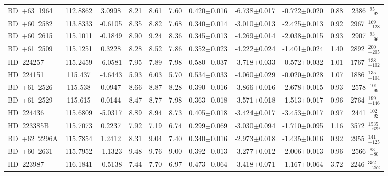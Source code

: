 {\begin{longtable}{lcccccccccc}
\noalign{\smallskip}
BD~+63~1964 & 112.8862 & 3.0998 & 8.21 & 8.61 & 7.60 & 0.420$\pm$0.016 & -6.738$\pm$0.017 & -0.722$\pm$0.020 & 0.88 & 2386~$_{-92}^{95}$ \\
\noalign{\smallskip}
BD~+60~2582 & 113.8333 & -0.6105 & 8.35 & 8.82 & 7.68 & 0.340$\pm$0.014 & -3.010$\pm$0.013 & -2.425$\pm$0.013 & 0.92 & 2967~$_{-128}^{169}$ \\
\noalign{\smallskip}
BD~+60~2615 & 115.1011 & -0.1849 & 8.90 & 9.24 & 8.36 & 0.345$\pm$0.013 & -4.269$\pm$0.014 & -2.038$\pm$0.015 & 0.93 & 2907~$_{-96}^{93}$ \\
\noalign{\smallskip}
BD~+61~2509 & 115.1251 & 0.3228 & 8.28 & 8.52 & 7.86 & 0.352$\pm$0.023 & -4.222$\pm$0.024 & -1.401$\pm$0.024 & 1.40 & 2892~$_{-205}^{200}$ \\
\noalign{\smallskip}
HD~224257 & 115.2459 & -6.0581 & 7.95 & 7.89 & 7.98 & 0.580$\pm$0.037 & -3.718$\pm$0.033 & -0.572$\pm$0.032 & 1.01 & 1767~$_{-102}^{138}$ \\
\noalign{\smallskip}
HD~224151 & 115.437 & -4.6443 & 5.93 & 6.03 & 5.70 & 0.534$\pm$0.033 & -4.060$\pm$0.029 & -0.020$\pm$0.028 & 1.07 & 1886~$_{-104}^{135}$ \\
\noalign{\smallskip}
BD~+61~2526 & 115.538 & 0.0947 & 8.66 & 8.87 & 8.28 & 0.390$\pm$0.016 & -3.866$\pm$0.016 & -2.678$\pm$0.015 & 0.93 & 2578~$_{-99}^{101}$ \\
\noalign{\smallskip}
BD~+61~2529 & 115.615 & 0.0144 & 8.47 & 8.77 & 7.98 & 0.363$\pm$0.018 & -3.571$\pm$0.018 & -1.513$\pm$0.017 & 0.96 & 2764~$_{-146}^{199}$ \\
\noalign{\smallskip}
HD~224436 & 115.6809 & -5.0317 & 8.89 & 8.94 & 8.73 & 0.405$\pm$0.018 & -3.424$\pm$0.017 & -3.453$\pm$0.017 & 0.97 & 2441~$_{-92}^{102}$ \\
\noalign{\smallskip}
HD~223385B & 115.7073 & 0.2237 & 7.92 & 7.19 & 6.74 & 0.299$\pm$0.069 & -3.030$\pm$0.094 & -1.710$\pm$0.095 & 1.16 & 3572~$_{-629}^{1535}$ \\
\noalign{\smallskip}
BD~+62~2296A & 115.7854 & 1.2412 & 8.31 & 9.04 & 7.40 & 0.340$\pm$0.016 & -2.973$\pm$0.018 & -1.435$\pm$0.016 & 0.92 & 2955~$_{-125}^{141}$ \\
\noalign{\smallskip}
BD~+60~2631 & 115.7952 & -1.1323 & 9.48 & 9.76 & 9.00 & 0.392$\pm$0.013 & -3.277$\pm$0.012 & -2.006$\pm$0.013 & 0.96 & 2566~$_{-80}^{83}$ \\
\noalign{\smallskip}
HD~223987 & 116.1841 & -0.5138 & 7.44 & 7.70 & 6.97 & 0.473$\pm$0.064 & -3.418$\pm$0.071 & -1.167$\pm$0.064 & 3.72 & 2246~$_{-252}^{352}$ \\

\end{longtable}}
